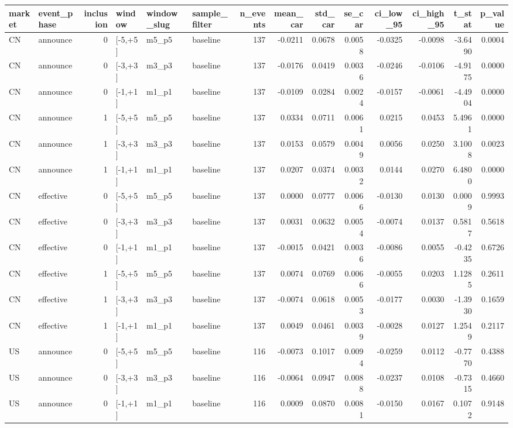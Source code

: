 \begin{tabular}{llrlllrrrrrrrr}
\toprule
market & event_phase & inclusion & window & window_slug & sample_filter & n_events & mean_car & std_car & se_car & ci_low_95 & ci_high_95 & t_stat & p_value \\
\midrule
CN & announce & 0 & [-5,+5] & m5_p5 & baseline & 137 & -0.0211 & 0.0678 & 0.0058 & -0.0325 & -0.0098 & -3.6490 & 0.0004 \\
CN & announce & 0 & [-3,+3] & m3_p3 & baseline & 137 & -0.0176 & 0.0419 & 0.0036 & -0.0246 & -0.0106 & -4.9175 & 0.0000 \\
CN & announce & 0 & [-1,+1] & m1_p1 & baseline & 137 & -0.0109 & 0.0284 & 0.0024 & -0.0157 & -0.0061 & -4.4904 & 0.0000 \\
CN & announce & 1 & [-5,+5] & m5_p5 & baseline & 137 & 0.0334 & 0.0711 & 0.0061 & 0.0215 & 0.0453 & 5.4961 & 0.0000 \\
CN & announce & 1 & [-3,+3] & m3_p3 & baseline & 137 & 0.0153 & 0.0579 & 0.0049 & 0.0056 & 0.0250 & 3.1008 & 0.0023 \\
CN & announce & 1 & [-1,+1] & m1_p1 & baseline & 137 & 0.0207 & 0.0374 & 0.0032 & 0.0144 & 0.0270 & 6.4800 & 0.0000 \\
CN & effective & 0 & [-5,+5] & m5_p5 & baseline & 137 & 0.0000 & 0.0777 & 0.0066 & -0.0130 & 0.0130 & 0.0009 & 0.9993 \\
CN & effective & 0 & [-3,+3] & m3_p3 & baseline & 137 & 0.0031 & 0.0632 & 0.0054 & -0.0074 & 0.0137 & 0.5817 & 0.5618 \\
CN & effective & 0 & [-1,+1] & m1_p1 & baseline & 137 & -0.0015 & 0.0421 & 0.0036 & -0.0086 & 0.0055 & -0.4235 & 0.6726 \\
CN & effective & 1 & [-5,+5] & m5_p5 & baseline & 137 & 0.0074 & 0.0769 & 0.0066 & -0.0055 & 0.0203 & 1.1285 & 0.2611 \\
CN & effective & 1 & [-3,+3] & m3_p3 & baseline & 137 & -0.0074 & 0.0618 & 0.0053 & -0.0177 & 0.0030 & -1.3930 & 0.1659 \\
CN & effective & 1 & [-1,+1] & m1_p1 & baseline & 137 & 0.0049 & 0.0461 & 0.0039 & -0.0028 & 0.0127 & 1.2549 & 0.2117 \\
US & announce & 0 & [-5,+5] & m5_p5 & baseline & 116 & -0.0073 & 0.1017 & 0.0094 & -0.0259 & 0.0112 & -0.7770 & 0.4388 \\
US & announce & 0 & [-3,+3] & m3_p3 & baseline & 116 & -0.0064 & 0.0947 & 0.0088 & -0.0237 & 0.0108 & -0.7315 & 0.4660 \\
US & announce & 0 & [-1,+1] & m1_p1 & baseline & 116 & 0.0009 & 0.0870 & 0.0081 & -0.0150 & 0.0167 & 0.1072 & 0.9148 \\

\end{tabular}
